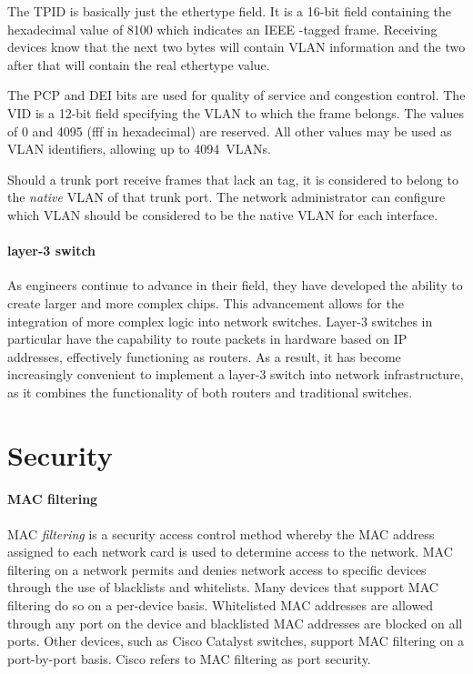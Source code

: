 
The \acl{TPID} is basically just the ethertype field.
It is a 16-bit field containing the hexadecimal value of 8100 which indicates an \acs{IEEE} -tagged frame.
Receiving devices know that the next two bytes will contain \acs{VLAN} information and the two after that will contain the real ethertype value.

The \acs{PCP} and \acs{DEI} bits are used for quality of service and congestion control.
The \acl{VID} is a 12-bit field specifying the \acs{VLAN} to which the frame belongs.
The values of 0 and 4095 (f{}f{}f in hexadecimal) are reserved.
All other values may be used as \acs{VLAN} identifiers, allowing up to 4094~\acp{VLAN}.

Should a trunk port receive frames that lack an  tag, it is considered to belong to the \emph{native} \acs{VLAN} of that trunk port.
The network administrator can configure which \acs{VLAN} should be considered to be the native \acs{VLAN} for each interface.


\paragraph{layer-3 switch}
As engineers continue to advance in their field, they have developed the ability to create larger and more complex chips.
This advancement allows for the integration of more complex logic into network switches.
Layer-3 switches in particular have the capability to route packets in hardware based on \acs{IP} addresses, effectively functioning as routers.
As a result, it has become increasingly convenient to implement a layer-3 switch into network infrastructure, as it combines the functionality of both routers and traditional switches.




\section{Security}

\paragraph{\acs{MAC} filtering}
\ac{MAC} \emph{filtering} is a security access control method whereby the \acs{MAC} address assigned to each network card is used to determine access to the network.
\ac{MAC} filtering on a network permits and denies network access to specific devices through the use of blacklists and whitelists.
Many devices that support \acs{MAC} filtering do so on a per-device basis.
Whitelisted \ac{MAC} addresses are allowed through any port on the device and blacklisted \acs{MAC} addresses are blocked on all ports.
Other devices, such as Cisco Catalyst switches, support \acs{MAC} filtering on a port-by-port basis.
Cisco refers to \acs{MAC} filtering as port security.

